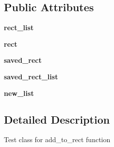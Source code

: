 \subsection*{\-Public \-Attributes}
\begin{DoxyCompactItemize}
\item 
\hypertarget{classinterface_1_1test__utils_1_1_add_to_rect_list_test_case_a054da454852c75d8b292162bf63c4dbe}{{\bfseries rect\-\_\-list}}\label{classinterface_1_1test__utils_1_1_add_to_rect_list_test_case_a054da454852c75d8b292162bf63c4dbe}

\item 
\hypertarget{classinterface_1_1test__utils_1_1_add_to_rect_list_test_case_ae1050d20047ba93de2ad0ec595f3e6f6}{{\bfseries rect}}\label{classinterface_1_1test__utils_1_1_add_to_rect_list_test_case_ae1050d20047ba93de2ad0ec595f3e6f6}

\item 
\hypertarget{classinterface_1_1test__utils_1_1_add_to_rect_list_test_case_aa7c2d5f504cee0c0a4c3122eb435bd54}{{\bfseries saved\-\_\-rect}}\label{classinterface_1_1test__utils_1_1_add_to_rect_list_test_case_aa7c2d5f504cee0c0a4c3122eb435bd54}

\item 
\hypertarget{classinterface_1_1test__utils_1_1_add_to_rect_list_test_case_a76d938c6220074cd99e918a7081d38b7}{{\bfseries saved\-\_\-rect\-\_\-list}}\label{classinterface_1_1test__utils_1_1_add_to_rect_list_test_case_a76d938c6220074cd99e918a7081d38b7}

\item 
\hypertarget{classinterface_1_1test__utils_1_1_add_to_rect_list_test_case_a1ab0ddfee47cccff0250e5e791f5ffd2}{{\bfseries new\-\_\-list}}\label{classinterface_1_1test__utils_1_1_add_to_rect_list_test_case_a1ab0ddfee47cccff0250e5e791f5ffd2}

\end{DoxyCompactItemize}


\subsection{\-Detailed \-Description}
\begin{DoxyVerb}Test class for add_to_rect function \end{DoxyVerb}
 

